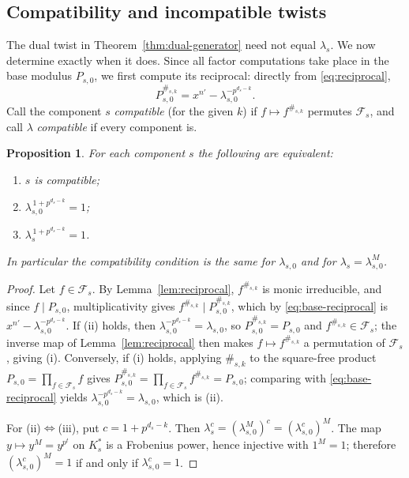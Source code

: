 \documentclass[11pt,a4paper]{article}
\newcommand{\Fs}{\mathcal F_s}
\numberwithin{equation}{section}
\theoremstyle{plain}
\newtheorem{proposition}[theorem]{Proposition}
\theoremstyle{definition}
\theoremstyle{remark}
\begin{document}
\subsection{Compatibility and incompatible twists}\label{sec:compatibility}

The dual twist in Theorem~\ref{thm:dual-generator} need not equal $\lambda_s$.
We now determine exactly when it does.  Since all factor computations take place
in the base modulus $P_{s,0}$, we first compute its reciprocal: directly from
\eqref{eq:reciprocal},
\begin{equation}\label{eq:base-reciprocal}
P_{s,0}^{\#_{s,k}}
   =x^{n'}-\lambda_{s,0}^{-p^{d_s-k}}.
\end{equation}
Call the component $s$ \emph{compatible} (for the given $k$) if
$f\mapsto f^{\#_{s,k}}$ permutes $\Fs$, and call $\lambda$ \emph{compatible} if
every component is.

\begin{proposition}\label{prop:compatibility}
For each component $s$ the following are equivalent:
\begin{enumerate}
\item[\textup{(i)}] $s$ is compatible;
\item[\textup{(ii)}] $\lambda_{s,0}^{\,1+p^{d_s-k}}=1$;
\item[\textup{(iii)}] $\lambda_s^{\,1+p^{d_s-k}}=1$.
\end{enumerate}
In particular the compatibility condition is the same for $\lambda_{s,0}$ and
for $\lambda_s=\lambda_{s,0}^M$.
\end{proposition}

\begin{proof}
Let $f\in\Fs$.  By Lemma~\ref{lem:reciprocal}, $f^{\#_{s,k}}$ is monic
irreducible, and since $f\mid P_{s,0}$, multiplicativity gives
$f^{\#_{s,k}}\mid P_{s,0}^{\#_{s,k}}$, which by \eqref{eq:base-reciprocal} is
$x^{n'}-\lambda_{s,0}^{-p^{d_s-k}}$.  If (ii) holds, then
$\lambda_{s,0}^{-p^{d_s-k}}=\lambda_{s,0}$, so
$P_{s,0}^{\#_{s,k}}=P_{s,0}$ and $f^{\#_{s,k}}\in\Fs$; the inverse map of
Lemma~\ref{lem:reciprocal} then makes $f\mapsto f^{\#_{s,k}}$ a permutation of
$\Fs$, giving (i).  Conversely, if (i) holds, applying $\#_{s,k}$ to the
square-free product $P_{s,0}=\prod_{f\in\Fs}f$ gives
$P_{s,0}^{\#_{s,k}}=\prod_{f\in\Fs}f^{\#_{s,k}}=P_{s,0}$; comparing with
\eqref{eq:base-reciprocal} yields
$\lambda_{s,0}^{-p^{d_s-k}}=\lambda_{s,0}$, which is (ii).

For (ii)$\Leftrightarrow$(iii), put $c=1+p^{d_s-k}$.  Then
$\lambda_s^c=(\lambda_{s,0}^M)^c=(\lambda_{s,0}^c)^M$.  The map
$y\mapsto y^M=y^{p^t}$ on $K_s^\ast$ is a Frobenius power, hence injective with
$1^M=1$; therefore $(\lambda_{s,0}^c)^M=1$ if and only if
$\lambda_{s,0}^c=1$.
\end{proof}
\end{document}

